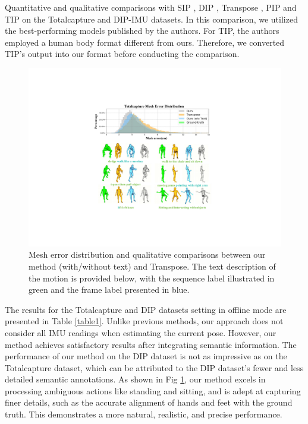 \documentclass[letterpaper]{article} %
\begin{document}
Quantitative and qualitative comparisons with SIP \cite{von2017sparse}, DIP \cite{huang2018deep}, Transpose \cite{yi2021transpose}, PIP \cite{yi2022physical} and TIP \cite{jiang2022transformer} on the Totalcapture and DIP-IMU datasets. In this comparison, we utilized the best-performing models published by the authors. For TIP, the authors employed a human body format different from ours. Therefore, we converted TIP's output into our format before conducting the comparison. 
\begin{figure}[h]
\centering
\includegraphics[width=\columnwidth]{Mesh_err.pdf} 
\caption{Mesh error distribution and qualitative comparisons between our method (with/without text) and Transpose. The text description of the motion is provided below, with the sequence label illustrated in green and the frame label presented in blue.}
\label{fig5}
\end{figure}
The results for the Totalcapture and DIP datasets setting in offline mode are presented in Table \ref{table1}.
Unlike previous methods, our approach does not consider all IMU readings when estimating the current pose. However, our method achieves satisfactory results after integrating semantic information. The performance of our method on the DIP dataset is not as impressive as on the Totalcapture dataset, which can be attributed to the DIP dataset's fewer and less detailed semantic annotations. 
As shown in Fig \ref{fig5}, our method excels in processing ambiguous actions like standing and sitting, and is adept at capturing finer details, such as the accurate alignment of hands and feet with the ground truth. This demonstrates a more natural, realistic, and precise performance.
\end{document}
